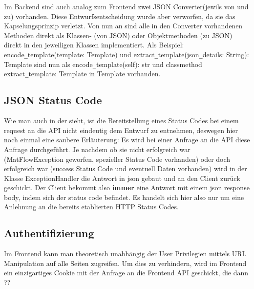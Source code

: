         \vspace{0.3in}
        Im Backend sind auch analog zum Frontend zwei JSON Converter(jewils von und zu) vorhanden.
        Diese Entwurfsentscheidung wurde aber verworfen, da sie das Kapselungsprinzip verletzt.
        Von nun an sind alle in den Converter vorhandenen Methoden direkt als Klassen- (von JSON)
        oder Objektmethoden (zu JSON) direkt in den jeweiligen Klassen implementiert. Als Beispiel: 
        encode\texttt{\_}template(template: Template) und extract\texttt{\_}template(json\texttt{\_}details: String): Template
        sind nun als encode\texttt{\_}template(self): str und \texttt{\@}classmethod extract\texttt{\_}template: Template 
        in Template vorhanden.    


\subsection{JSON Status Code}
Wie man auch in der  sieht, ist die Bereitstellung eines Status Codes bei einem request an die API nicht eindeutig
dem Entwurf zu entnehmen, deswegen hier noch einmal eine saubere Erläuterung:
Es wird bei einer Anfrage an die API diese Anfrage durchgeführt. Je nachdem ob sie nicht erfolgreich war (MatFlowException 
geworfen, spezieller Status Code vorhanden) oder doch erfolgreich war (success Status Code und eventuell Daten vorhanden) 
wird in der Klasse ExceptionHandler die Antwort in json gebaut und an den Client zurück geschickt. 
Der Client bekommt also \textbf{immer} eine Antwort mit einem json response body, indem sich der status code befindet. 
Es handelt sich hier also nur um eine Anlehnung an die bereits etablierten HTTP Status Codes.

\subsection{Authentifizierung} \label{Cookie}
Im Frontend kann man theoretisch unabhängig der User Privilegien mittels URL Manipulation auf alle 
Seiten zugreifen. Um dies zu verhindern, wird im Frontend ein einzigartiges Cookie mit der Anfrage an die Frontend
API geschickt, die dann ??





